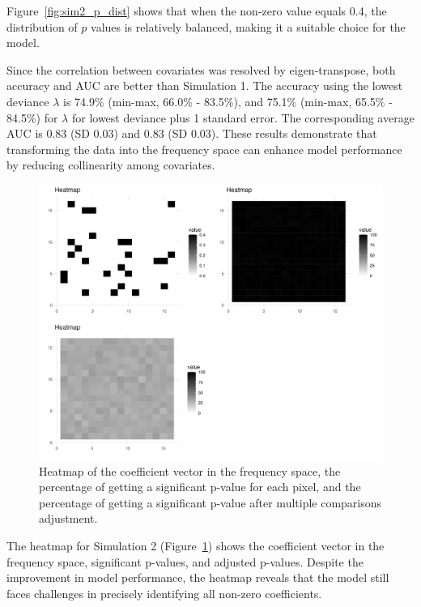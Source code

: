 \documentclass[12pt]{article}
\begin{document}
Figure~\ref{fig:sim2_p_dist} shows that when the non-zero value equals 0.4, the distribution of \(p\) values is relatively balanced, making it a suitable choice for the model.

Since the correlation between covariates was resolved by eigen-transpose, both accuracy and AUC are better than Simulation 1. The accuracy using the lowest deviance \(\lambda\) is 74.9\% (min-max, 66.0\% - 83.5\%), and 75.1\% (min-max, 65.5\% - 84.5\%) for \(\lambda\) for lowest deviance plus 1 standard error. The corresponding average AUC is 0.83 (SD 0.03) and 0.83 (SD 0.03). These results demonstrate that transforming the data into the frequency space can enhance model performance by reducing collinearity among covariates.

\begin{figure}[H]
    \centering
    \includegraphics[width=\textwidth]{../Figures/sim2_heatmap.png}
    \caption{Heatmap of the coefficient vector in the frequency space, the percentage of getting a significant p-value for each pixel, and the percentage of getting a significant p-value after multiple comparisons adjustment.}
    \label{fig:sim2_heatmap}
\end{figure}

The heatmap for Simulation 2 (Figure~\ref{fig:sim2_heatmap}) shows the coefficient vector in the frequency space, significant p-values, and adjusted p-values. Despite the improvement in model performance, the heatmap reveals that the model still faces challenges in precisely identifying all non-zero coefficients.
\end{document}
